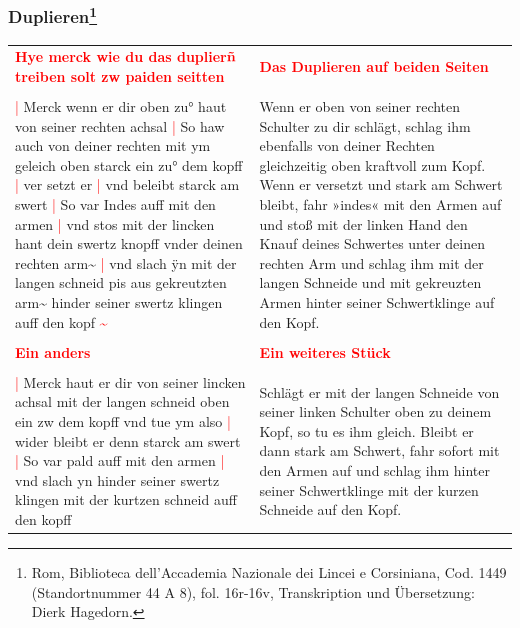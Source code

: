\newpage

\subsubsection[Duplieren]{
    Duplieren\footnote{
        \hspace*{0.5ex}Rom, Biblioteca dell'Accademia Nazionale dei Lincei e Corsiniana,
        Cod. 1449 (Standortnummer 44 A 8), fol. 16r-16v, Transkription und Übersetzung: Dierk Hagedorn.}}

\begin{longtable}{p{6.25cm}p{6.25cm}}
    \textbf{\textcolor{red}{
        Hye merck wie du das duplierñ treiben solt zw paiden seitten}}
    &
    \textbf{\textcolor{red}{
        Das Duplieren auf beiden Seiten}}
    \\
    \\
    \textcolor{red}{|} Merck wenn er dir oben zu° haut von seiner rechten achsal
    \textcolor{red}{|} So haw auch von deiner rechten mit ym geleich oben starck ein zu° dem kopff
    \textcolor{red}{|} ver setzt er
    \textcolor{red}{|} vnd beleibt starck am swert
    \textcolor{red}{|} So var Indes auff mit den armen
    \textcolor{red}{|} vnd stos mit der lincken hant dein swertz knopff vnder deinen rechten arm\textasciitilde{}
    \textcolor{red}{|} vnd slach ÿn mit der langen schneid pis aus gekreutzten arm\textasciitilde{} hinder seiner swertz klingen auff den kopf \textcolor{red}{\textasciitilde{}}
    &
    Wenn er oben von seiner rechten Schulter zu dir schlägt, schlag ihm ebenfalls von deiner Rechten gleichzeitig oben kraftvoll zum Kopf.
    Wenn er versetzt und stark am Schwert bleibt, fahr »indes« mit den Armen auf und stoß mit der linken Hand den Knauf deines Schwertes unter deinen rechten Arm und schlag ihm mit der langen Schneide und mit gekreuzten Armen hinter seiner Schwertklinge auf den Kopf.
    \\
    \\
    \textbf{\textcolor{red}{
        Ein anders}}
    &
    \textbf{\textcolor{red}{
        Ein weiteres Stück}}
    \\
    \\
    \textcolor{red}{|} Merck haut er dir von seiner lincken achsal mit der langen schneid oben ein zw dem kopff vnd tue ym also
    \textcolor{red}{|} wider bleibt er denn starck am swert
    \textcolor{red}{|} So var pald auff mit den armen
    \textcolor{red}{|} vnd slach yn hinder seiner swertz klingen mit der kurtzen schneid auff den kopff
    &
    Schlägt er mit der langen Schneide von seiner linken Schulter oben zu deinem Kopf, so tu es ihm gleich.
    Bleibt er dann stark am Schwert, fahr sofort mit den Armen auf und schlag ihm hinter seiner Schwertklinge mit der kurzen Schneide auf den Kopf.
\end{longtable}

